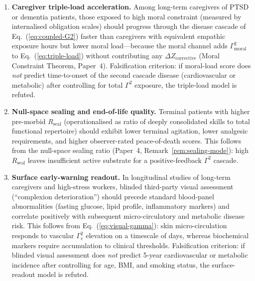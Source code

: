 \documentclass[aps,pre,twocolumn,superscriptaddress,floatfix]{revtex4-2}
\begin{document}
\begin{enumerate}
  \item \textbf{Caregiver triple-load acceleration.}
    Among long-term caregivers of PTSD or dementia
    patients, those exposed to high moral constraint
    (measured by internalised obligation scales) should
    progress through the disease cascade of
    Eq.~(\ref{eq:coupled-G2}) faster than
    caregivers with equivalent empathic exposure hours
    but lower moral load---because the moral channel
    adds $\Gamma^2_{\text{moral}}$ to
    Eq.~(\ref{eq:triple-load}) without contributing
    any $\Delta Z_{\text{corrective}}$
    (Moral Constraint Theorem, Paper~4).
    Falsification criterion: if moral-load score does
    \emph{not} predict time-to-onset of the second
    cascade disease (cardiovascular or metabolic)
    after controlling for total $\Gamma^2$ exposure,
    the triple-load model is refuted.

  \item \textbf{Null-space sealing and end-of-life
    quality.}
    Terminal patients with higher pre-morbid
    $R_{\text{seal}}$ (operationalised as ratio of
    deeply consolidated skills to total functional
    repertoire) should exhibit lower terminal agitation,
    lower analgesic requirements, and higher
    observer-rated peace-of-death scores.
    This follows from the null-space sealing ratio
    (Paper~4, Remark~\ref{rem:sealing-mode}):
    high $R_{\text{seal}}$ leaves insufficient active
    substrate for a positive-feedback $\Gamma^2$ cascade.

  \item \textbf{Surface early-warning readout.}
    In longitudinal studies of long-term caregivers
    and high-stress workers, blinded third-party visual
    assessment (``complexion deterioration'') should
    precede standard blood-panel abnormalities
    (fasting glucose, lipid profile, inflammatory
    markers) and correlate positively with subsequent
    micro-circulatory and metabolic disease risk.
    This follows from Eq.~(\ref{eq:visual-gamma}):
    skin micro-circulation responds to vascular
    $\Gamma_v^2$ elevation on a timescale of days,
    whereas biochemical markers require accumulation
    to clinical thresholds.
    Falsification criterion: if blinded visual
    assessment does \emph{not} predict 5-year
    cardiovascular or metabolic incidence after
    controlling for age, BMI, and smoking status,
    the surface-readout model is refuted.


\end{enumerate}
\end{document}
